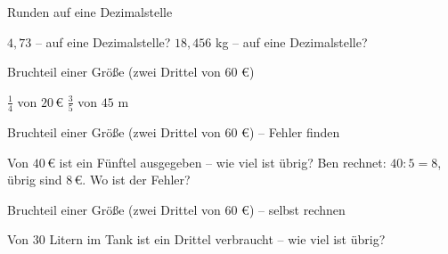 \begin{aufgabe}{Runden auf eine Dezimalstelle}
\begin{teile}
\teil $4{,}73$ – auf eine Dezimalstelle? \leerfeld
\teil $18{,}456$ kg – auf eine Dezimalstelle? \leerfeld[kg]
\end{teile}
\end{aufgabe}

\begin{aufgabe}{Bruchteil einer Größe (zwei Drittel von 60 €)}
\begin{teile}
\teil $\frac{1}{4}$ von $20\,€$ \leerfeld[€]
\teil $\frac{3}{5}$ von $45$ m \leerfeld[m]
\end{teile}
\end{aufgabe}

\begin{aufgabe}{Bruchteil einer Größe (zwei Drittel von 60 €) – Fehler finden}
\begin{teile}
\teil Von $40\,€$ ist ein Fünftel ausgegeben – wie viel ist übrig? Ben rechnet: $40 : 5 = 8$, übrig sind $8\,€$. Wo ist der Fehler?
\end{teile}
\end{aufgabe}

\begin{aufgabe}{Bruchteil einer Größe (zwei Drittel von 60 €) – selbst rechnen}
\begin{teile}
\teil Von $30$ Litern im Tank ist ein Drittel verbraucht – wie viel ist übrig? \leerfeld[l]
\end{teile}
\end{aufgabe}
